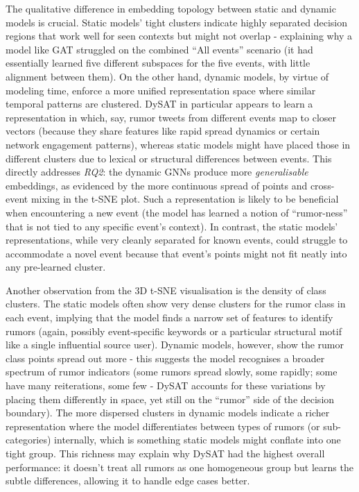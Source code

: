 \documentclass{cshonours}
\begin{document}
The qualitative difference in embedding topology between static and dynamic models is crucial. Static models' tight clusters indicate highly separated decision regions that work well for seen contexts but might not overlap - explaining why a model like GAT struggled on the combined ``All events'' scenario (it had essentially learned five different subspaces for the five events, with little alignment between them). On the other hand, dynamic models, by virtue of modeling time, enforce a more unified representation space where similar temporal patterns are clustered. DySAT in particular appears to learn a representation in which, say, rumor tweets from different events map to closer vectors (because they share features like rapid spread dynamics or certain network engagement patterns), whereas static models might have placed those in different clusters due to lexical or structural differences between events. This directly addresses \emph{RQ2}: the dynamic GNNs produce more \emph{generalisable} embeddings, as evidenced by the more continuous spread of points and cross-event mixing in the t-SNE plot. Such a representation is likely to be beneficial when encountering a new event (the model has learned a notion of ``rumor-ness'' that is not tied to any specific event's context). In contrast, the static models' representations, while very cleanly separated for known events, could struggle to accommodate a novel event because that event's points might not fit neatly into any pre-learned cluster.



Another observation from the 3D t-SNE visualisation is the density of class clusters. The static models often show very dense clusters for the rumor class in each event, implying that the model finds a narrow set of features to identify rumors (again, possibly event-specific keywords or a particular structural motif like a single influential source user). Dynamic models, however, show the rumor class points spread out more - this suggests the model recognises a broader spectrum of rumor indicators (some rumors spread slowly, some rapidly; some have many reiterations, some few - DySAT accounts for these variations by placing them differently in space, yet still on the ``rumor'' side of the decision boundary). The more dispersed clusters in dynamic models indicate a richer representation where the model differentiates between types of rumors (or sub-categories) internally, which is something static models might conflate into one tight group. This richness may explain why DySAT had the highest overall performance: it doesn't treat all rumors as one homogeneous group but learns the subtle differences, allowing it to handle edge cases better.
\end{document}
